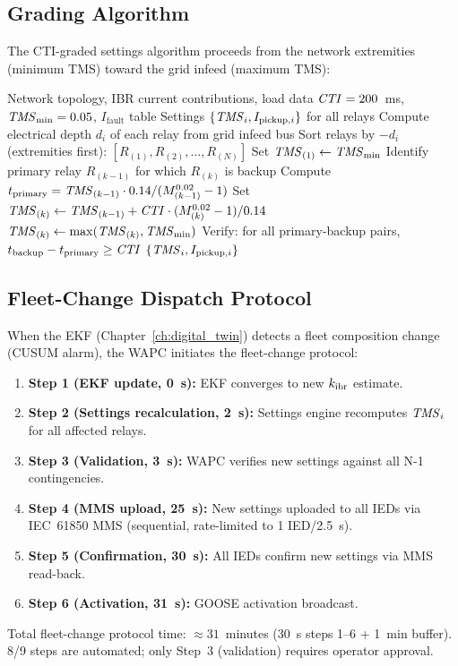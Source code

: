 \subsection{Grading Algorithm}

The CTI-graded settings algorithm proceeds from the network extremities
(minimum TMS) toward the grid infeed (maximum TMS):

\begin{algorithm}[htbp]
\caption{CTI-Graded Settings Engine (C16)}
\label{alg:ch9_settings}
\begin{algorithmic}[1]
\Require Network topology, IBR current contributions, load data
\Require $\mathit{CTI} = 200$~ms, $\mathit{TMS}_\mathrm{min} = 0.05$, $I_\mathrm{fault}$ table
\Ensure Settings $\{\mathit{TMS}_i, I_{\mathrm{pickup},i}\}$ for all relays
\State Compute electrical depth $d_i$ of each relay from grid infeed bus
\State Sort relays by $-d_i$ (extremities first): $[R_{(1)}, R_{(2)}, \ldots, R_{(N)}]$
\State Set $\mathit{TMS}_{(1)} \leftarrow \mathit{TMS}_\mathrm{min}$ 
  \State Identify primary relay $R_{(k-1)}$ for which $R_{(k)}$ is backup
  \State Compute $t_\mathrm{primary} = \mathit{TMS}_{(k-1)} \cdot 0.14 / (M_{(k-1)}^{0.02} - 1)$
  \State Set $\mathit{TMS}_{(k)} \leftarrow \mathit{TMS}_{(k-1)} + \mathit{CTI} \cdot (M_{(k)}^{0.02} - 1)/0.14$
  \State $\mathit{TMS}_{(k)} \leftarrow \max(\mathit{TMS}_{(k)}, \mathit{TMS}_\mathrm{min})$
\EndFor
\State Verify: for all primary-backup pairs, $t_\mathrm{backup} - t_\mathrm{primary} \geq \mathit{CTI}$
\State \Return $\{\mathit{TMS}_i, I_{\mathrm{pickup},i}\}$
\end{algorithmic}
\end{algorithm}

\subsection{Fleet-Change Dispatch Protocol}

When the EKF (Chapter~\ref{ch:digital_twin}) detects a fleet composition
change (CUSUM alarm), the WAPC initiates the fleet-change protocol:
\begin{enumerate}
\item \textbf{Step 1 (EKF update, 0~s):} EKF converges to new $k_\mathrm{ibr}$ estimate.
\item \textbf{Step 2 (Settings recalculation, 2~s):} Settings engine
      recomputes $\mathit{TMS}_i$ for all affected relays.
\item \textbf{Step 3 (Validation, 3~s):} WAPC verifies new settings
      against all N-1 contingencies.
\item \textbf{Step 4 (MMS upload, 25~s):} New settings uploaded to all
      IEDs via IEC~61850 MMS (sequential, rate-limited to 1 IED/2.5~s).
\item \textbf{Step 5 (Confirmation, 30~s):} All IEDs confirm new settings
      via MMS read-back.
\item \textbf{Step 6 (Activation, 31~s):} GOOSE activation broadcast.
\end{enumerate}
Total fleet-change protocol time: $\approx 31$~minutes (30~s steps 1--6 +
1~min buffer). 8/9 steps are automated; only Step~3 (validation) requires
operator approval.


